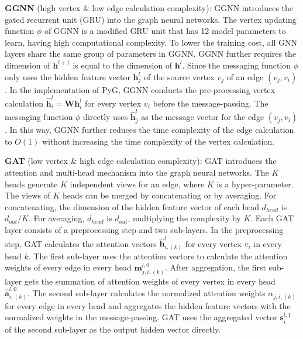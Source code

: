 \textbf{GGNN} (high vertex \& low edge calculation complexity):
GGNN \cite{li2015_ggnn} introduces the gated recurrent unit (GRU) into the graph neural networks.
The vertex updating function $\phi$ of GGNN is a modified GRU unit that has 12 model parameters to learn, having high computational complexity.
To lower the training cost, all GNN layers share the same group of parameters in GGNN.
GGNN further requires the dimension of $\boldsymbol{h}^{l+1}$ is equal to the dimension of $\boldsymbol{h}^l$.
Since the messaging function $\phi$ only uses the hidden feature vector $\boldsymbol{h}^l_j$ of the source vertex $v_j$ of an edge $(v_j, v_i)$. In the implementation of PyG, GGNN conducts the pre-processing vertex calculation $\hat{\boldsymbol{h}}^l_i=\boldsymbol{W}\boldsymbol{h}^l_i$ for every vertex $v_i$ before the message-passing.
The messaging function $\phi$ directly uses $\hat{\boldsymbol{h}}^l_j$ as the message vector for the edge $(v_j, v_i)$.
In this way, GGNN further reduces the time complexity of the edge calculation to $O(1)$ without increasing the time complexity of the vertex calculation.

\textbf{GAT} (low vertex \& high edge calculation complexity):
GAT \cite{huang2018_gat} introduces the attention and multi-head mechanism into the graph neural networks.
The $K$ heads generate $K$ independent views for an edge, where $K$ is a hyper-parameter.
The views of $K$ heads can be merged by concatenating or by averaging.
For concatenating, the dimension of the hidden feature vector of each head $d_{head}$ is $d_{out}/K$.
For averaging, $d_{head}$ is $d_{out}$, multiplying the complexity by $K$.
Each GAT layer consists of a preprocessing step and two sub-layers.
In the preprocessing step, GAT calculates the attention vectors $\hat{\boldsymbol{h}}^{l}_{i,(k)}$ for every vertex $v_i$ in every head $k$.
The first sub-layer uses the attention vectors to calculate the attention weights of every edge in every head $\boldsymbol{m}^{l,0}_{j,i,(k)}$.
After aggregation, the first sub-layer gets the summation of attention weights of every vertex in every head $\hat{\boldsymbol{a}}^{l,0}_{i,(k)}$.
The second sub-layer calculates the normalized attention weights $\alpha_{j, i, (k)}$ for every edge in every head and aggregates the hidden feature vectors with the normalized weights in the message-passing.
GAT uses the aggregated vector $\boldsymbol{s}^{l,1}_i$ of the second sub-layer as the output hidden vector directly.

